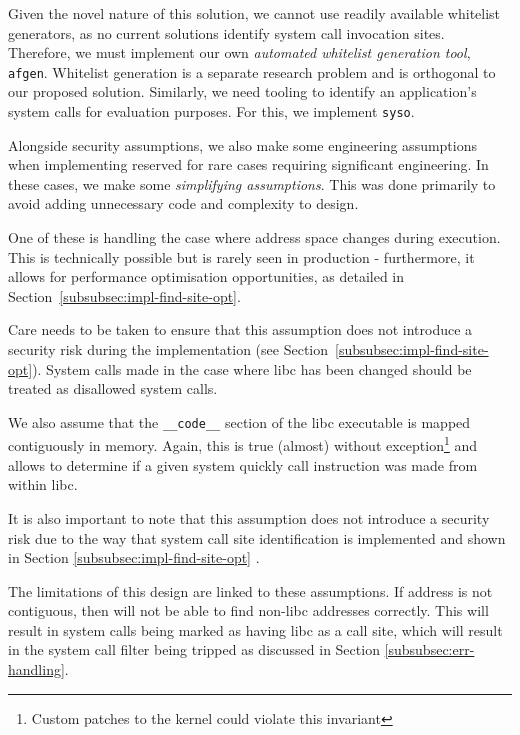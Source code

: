 Given the novel nature of this solution, we cannot use readily available
whitelist generators, as no current solutions identify system call
invocation sites. Therefore, we must implement our own \textit{automated whitelist 
generation tool}, \texttt{afgen}. Whitelist generation is a separate research problem and is
orthogonal to our proposed solution. Similarly, we need tooling to identify an
application's system calls for evaluation purposes. For this, we implement
\texttt{syso}.




Alongside security assumptions, we also make some engineering assumptions when
implementing \af reserved for rare cases requiring significant engineering. In these cases, we make some \textit{simplifying
assumptions}. This was done primarily to avoid adding unnecessary code and 
complexity to \afg design. 
 
One of these is handling the case where  address space changes during
execution. This is technically possible but is rarely seen in production -
furthermore, it allows for performance optimisation opportunities, as detailed in
Section~\ref{subsubsec:impl-find-site-opt}.

Care needs to be taken to ensure that this assumption does not introduce a
security risk during the implementation (see Section~\ref{subsubsec:impl-find-site-opt}). 
System calls made in the case where \ac{libc} has been changed should be
treated as disallowed system calls.

We also assume that the \texttt{\_\_code\_\_} section of the \ac{libc}
executable is mapped contiguously in memory. Again, this is
true (almost) without exception\footnote{Custom patches to the kernel could
violate this invariant} and allows \af to determine if a given system quickly
call instruction was made from within \ac{libc}.

It is also important to note that this assumption does not introduce a security
risk due to the way that system call site identification is implemented and shown in
Section \ref{subsubsec:impl-find-site-opt} \cite{glibc-dl-map-segments-h}.

The limitations of this design are linked to these assumptions. If 
address is not contiguous, then \af will not be able to find non-\ac{libc}
addresses correctly. This will result in system calls being marked as having 
\ac{libc} as a call site, which will result in the system call filter being
tripped as discussed in Section \ref{subsubsec:err-handling}. 

